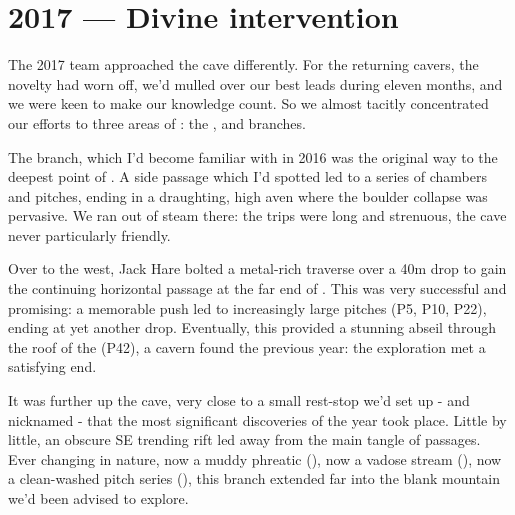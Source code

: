 \section{2017 --- Divine intervention}
The 2017 team approached the cave differently. For the returning cavers, the novelty had worn off, we’d mulled over our best leads during eleven months, and we were keen to make our knowledge count. So we almost tacitly concentrated our efforts to three areas of : the ,  and  branches.

The  branch, which I’d become familiar with in 2016 was the original way to the deepest point of . A side passage which I’d spotted led to a series of chambers and pitches, ending in a draughting, high aven where the boulder collapse was pervasive. We ran out of steam there: the trips were long and strenuous, the cave never particularly friendly.

Over to the west, Jack Hare bolted a metal-rich traverse over a 40m drop to gain the continuing horizontal passage at the far end of . This was very successful and promising: a memorable push led to increasingly large pitches (P5, P10, P22), ending at yet another drop. Eventually, this provided a stunning abseil through the roof of the  (P42), a cavern found the previous year: the exploration met a satisfying end.

It was further up the cave, very close to a small rest-stop we’d set up - and nicknamed - that the most significant discoveries of the year took place. Little by little, an obscure SE trending rift led away from the main tangle of passages. Ever changing in nature, now a muddy phreatic (), now a vadose stream (), now a clean-washed pitch series (), this branch extended far into the blank mountain we’d been advised to explore.  

